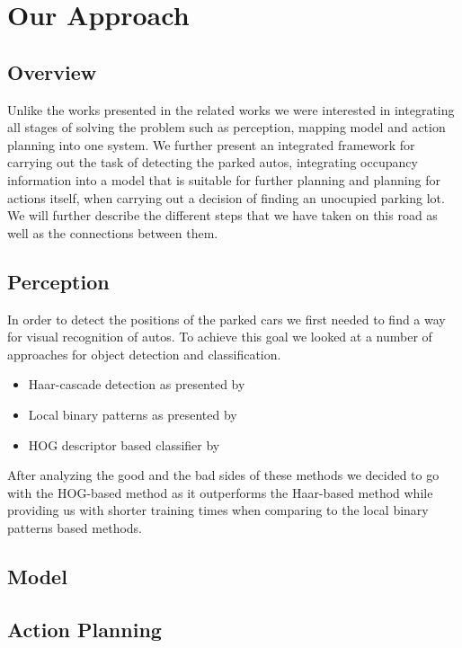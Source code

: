 \chapter{Our Approach}
\label{cha:our_approach}

\section{Overview} %
\label{sec:overview}
Unlike the works presented in the related works we were interested in integrating all stages of solving the problem such as perception, mapping model and action planning into one system. We further present an integrated framework for carrying out the task of detecting the parked autos,  integrating occupancy information into a model that is suitable for further planning and planning for actions itself, when carrying out a decision of finding an unocupied parking lot.
We will further describe the different steps that we have taken on this road as well as the connections between them.

\section{Perception} %
\label{sec:perception}
In order to detect the positions of the parked cars we first needed to find a way for visual recognition of autos. To achieve this goal we looked at a number of approaches for object detection and classification.
\begin{itemize}
 	\item Haar-cascade detection as presented by \cite{violajones2001}
 	\item Local binary patterns as presented by 
 	\item HOG descriptor based classifier by \cite{dalal2005}  
\end{itemize} 
After analyzing the good and the bad sides of these methods we decided to go with the HOG-based method as it outperforms the Haar-based method while providing us with shorter training times when comparing to the local binary patterns based methods.

\section{Model} %
\label{sec:model}


\section{Action Planning} %
\label{sec:action_planning}

